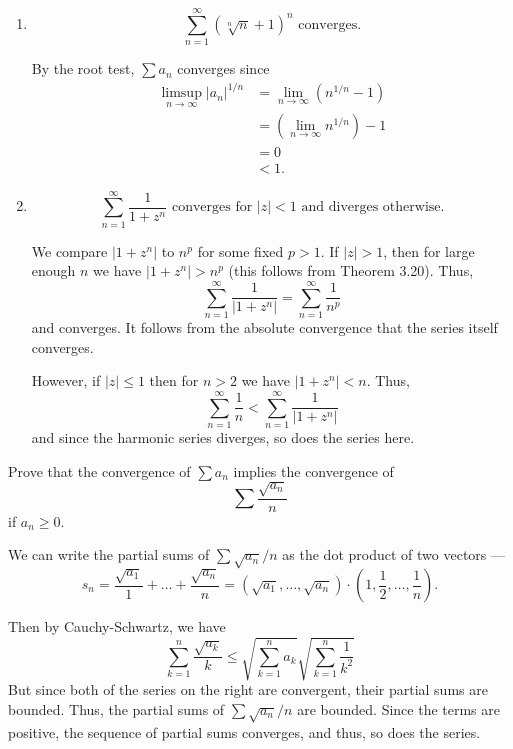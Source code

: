 \documentclass[12 pt, letterpaper]{hmcpset}
\begin{document}
\begin{solution}
\begin{enumerate}
			By the Archimedean property, $s_{n} \to 0$ and thus, $\sum a_{n} = 0$.
		\item
			\[
				\boxed{
					\sum_{n = 1}^{\infty} (\sqrt[n]{n} + 1)^{n} \text{ converges.}
				}
			\]

			By the root test, $\sum a_{n}$ converges since
			\[
				\begin{split}
					\limsup_{n \to \infty} \lvert a_{n} \rvert^{1/n} & = \lim_{n \to \infty} (n^{1/n} - 1) \\
											 & = (\lim_{n \to \infty} n^{1/n}) - 1 \\
											 & = 0 \\
											 & < 1.
				\end{split}
			\]
		\item
			\[
				\boxed{
					\sum_{n = 1}^{\infty} \frac{1}{1 + z^{n}} \text{ converges for } \lvert z \rvert < 1 \text{ and diverges otherwise.}
				}
			\]

			We compare $\lvert 1 + z^{n} \rvert$ to $n^{p}$ for some fixed $p > 1$. If $\lvert z \rvert > 1$, then for large enough $n$ we have $\lvert 1 + z^{n} \rvert > n^{p}$ (this follows from Theorem 3.20). Thus,
			\[
				\sum_{n = 1}^{\infty} \frac{1}{\lvert 1 + z^{n} \rvert} = \sum_{n = 1}^{\infty} \frac{1}{n^{p}}
			\]
			and converges. It follows from the absolute convergence that the series itself converges.

			However, if $\lvert z \rvert \le 1$ then for $n > 2$ we have $\lvert 1 + z^{n} \rvert < n$. Thus,
			\[
				\sum_{n = 1}^{\infty} \frac{1}{n} < \sum_{n = 1}^{\infty} \frac{1}{\lvert 1 + z^{n} \rvert}
			\]
			and since the harmonic series diverges, so does the series here.
	\end{enumerate}
\end{solution}

\pagebreak

\begin{problem}
	Prove that the convergence of $\sum a_{n}$ implies the convergence of
	\[
		\sum \frac{\sqrt{a_{n}}}{n}
	\]
	if $a_{n} \ge 0$.
\end{problem}

\begin{solution}
	We can write the partial sums of $\sum \sqrt{a_{n}} / n$ as the dot product of two vectors ---
	\[
		s_{n} = \frac{\sqrt{a_{1}}}{1} + \dots + \frac{\sqrt{a_{n}}}{n} = (\sqrt{a_{1}}, \dots, \sqrt{a_{n}}) \cdot \left ( 1, \frac{1}{2}, \dots, \frac{1}{n} \right ).
	\]

	Then by Cauchy-Schwartz, we have
	\[
		\sum_{k = 1}^{n} \frac{\sqrt{a_{k}}}{k} \le \sqrt{\sum_{k = 1}^{n} a_{k}} \sqrt{\sum_{k = 1}^{n} \frac{1}{k^{2}}}
	\]
	But since both of the series on the right are convergent, their partial sums are bounded. Thus, the partial sums of $\sum \sqrt{a_{n}} / n$ are bounded. Since the terms are positive, the sequence of partial sums converges, and thus, so does the series.
\end{solution}
\end{document}
